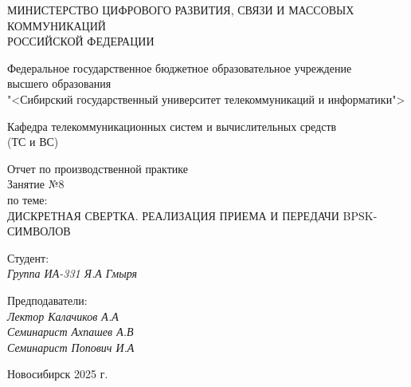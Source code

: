 \thispagestyle{empty}

\begin{center}
    МИНИСТЕРСТВО ЦИФРОВОГО РАЗВИТИЯ, СВЯЗИ И МАССОВЫХ КОММУНИКАЦИЙ \\ РОССИЙСКОЙ ФЕДЕРАЦИИ

    \vspace{20pt}

    Федеральное государственное бюджетное образовательное учреждение  \\  высшего образования \\
    "<Сибирский государственный университет телекоммуникаций и информатики"> \\

    \vspace{20pt}

    Кафедра телекоммуникационных систем и вычислительных средств \\  (ТС и ВС)
\end{center}

\vfill

\begin{center}
    Отчет по производственной практике \\  
    Занятие №8\\

    \vspace{20pt}
    по теме: \\
    \uppercase{Дискретная свертка. Реализация приема и передачи BPSK-символов}
\end{center}

\vfill

    \noindent Студент: \\
    \textit{Группа ИА-331 \hfill Я.А Гмыря}

    \vspace{20pt}

    \noindent Предподаватели: \\
    \textit{Лектор \hfill Калачиков А.А} \\
    \textit{Семинарист \hfill Ахпашев А.В} \\
    \textit{Семинарист \hfill Попович И.А}

\vfill

\begin{center}
    Новосибирск 2025 г.
\end{center}